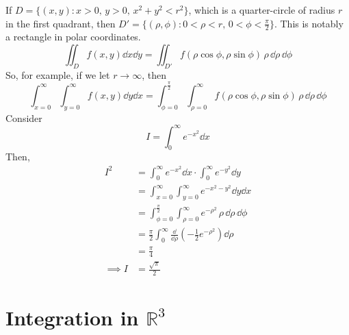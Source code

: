 \documentclass{article}
\begin{document}
If $D = \{ (x, y) \colon x > 0,\, y > 0,\, x^2 + y^2 < r^2 \}$, which is a quarter-circle of radius $r$ in the first quadrant, then $D' = \{ (\rho, \phi) \colon 0 < \rho < r,\, 0 < \phi < \frac{\pi}{2} \}$. This is notably a rectangle in polar coordinates.
\[ \iint_D f(x, y)\dd{x} \dd{y} = \iint_{D'} f(\rho \cos \phi, \rho \sin \phi) \,\rho \,\dd \rho \,\dd \phi \]
So, for example, if we let $r \to \infty$, then
\[ \int_{x=0}^\infty \int_{y=0}^\infty f(x, y) \dd{y}\dd{x} = \int_{\phi = 0}^{\frac{\pi}{2}} \int_{\rho = 0}^\infty f(\rho \cos \phi, \rho \sin \phi) \,\rho\,\dd \rho\,\dd \phi \]
Consider
\[ I = \int_0^\infty e^{-x^2} \dd{x} \]
Then,
\begin{align*}
    I^2        & = \int_0^\infty e^{-x^2} \dd{x} \cdot \int_0^\infty e^{-y^2} \dd{y}                                \\
               & = \int_{x=0}^\infty \int_{y=0}^\infty e^{-x^2-y^2} \dd{y}\dd{x}                                    \\
               & = \int_{\phi = 0}^{\frac{\pi}{2}} \int_{\rho = 0}^\infty e^{-\rho^2} \,\rho\,\dd \rho\,\dd \phi    \\
               & = \frac{\pi}{2} \int_0^\infty \frac{\dd}{\dd \rho} \left( -\frac{1}{2}e^{-\rho^2} \right) \dd \rho \\
               & = \frac{\pi}{4}                                                                                    \\
    \implies I & = \frac{\sqrt{\pi}}{2}
\end{align*}

\section{Integration in $\mathbb R^3$}
\end{document}
